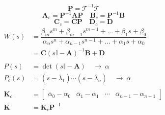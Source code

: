 \documentclass[a4paper]{article}
\renewcommand{\vec}{\bm}
\begin{document}
\begin{multicols}{2}
		\[
			\vec{P} = \mathcal{T}^{-1} \mathcal{T}
		\]
		\[
			\vec{A}_c = \vec{P}^{-1}\vec{A}\vec{P}\quad	\vec{B}_c = \vec{P}^{-1}\vec{B}
		\]
		\[
			\vec{C}_c = \vec{C}\vec{P}\quad \vec{D}_c = \vec{D}
		\]
		\begin{align*}
			W(s) &= \dfrac{\beta_m s^m + \beta_{m-1}s^{m-1} + \dots + \beta_1 s + \beta_0 }{\alpha_n s^n + \alpha_{n-1} s^{n-1} + \dots + \alpha_1 s + \alpha_0 } \\ 
				&= \vec{C}(s\mathbb{I} - \vec{A})^{-1}\vec{B} + \vec{D} \\ \\
			P(s) &= \det (s\mathbb{I} - \vec{A})\quad \rightarrow \ \alpha \\
			P_c (s) &= (s-\overline{\lambda}_1)\cdots (s-\overline{\lambda}_n) \quad \rightarrow \ \overline{\alpha} \\ \\
			\vec{K}_c &= 
			\begin{bmatrix}
				\overline{\alpha}_0 - \alpha_0 & \overline{\alpha}_1 - \alpha_1 & \cdots & \overline{\alpha}_{n-1} - \alpha_{n-1}
			\end{bmatrix} \\
			\vec{K} &= \vec{K}_c\vec{P}^{-1}
		\end{align*}
		
	\end{multicols}
	\vspace{-.5cm}
	\noindent\hrulefill
	\vspace{-.5cm}
\end{document}

